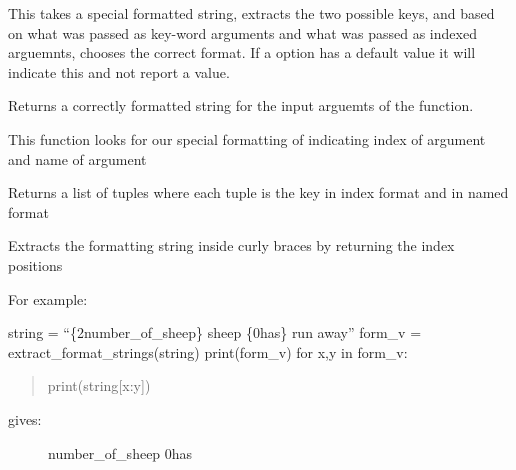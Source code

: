 \documentclass[letterpaper,10pt,english]{sphinxmanual}
\begin{document}

\begin{fulllineitems}
\label{\detokenize{modules/logging_setup:logging_setup.construct_formatted_format}}
This takes a special formatted string, extracts the two possible keys, 
and based on what was passed as key-word arguments and what was passed as indexed arguemnts, 
chooses the correct format. 
If a option has a default value it will indicate this and not report a value.

Returns a correctly formatted string for the input arguemts of the function.

\end{fulllineitems}


\begin{fulllineitems}
\label{\detokenize{modules/logging_setup:logging_setup.extract_format_keys}}
This function looks for our special formatting of indicating index of argument and name of argument

Returns a list of tuples where each tuple is the key in index format and in named format

\end{fulllineitems}


\begin{fulllineitems}
\label{\detokenize{modules/logging_setup:logging_setup.extract_format_strings}}
Extracts the formatting string inside curly braces by returning the index positions

For example:

string = “\{2\textbar{}number\_of\_sheep\} sheep \{0\textbar{}has\} run away”
form\_v = extract\_format\_strings(string)
print(form\_v)
for x,y in form\_v:
\begin{quote}

print(string{[}x:y{]})
\end{quote}
\begin{description}
\item[{gives:}] \textbar{}number\_of\_sheep
0\textbar{}has

\end{description}

\end{fulllineitems}
\end{document}
